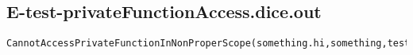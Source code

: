 \subsection{E-test-privateFunctionAccess.dice.out}
\begin{verbatim}
CannotAccessPrivateFunctionInNonProperScope(something.hi,something,test)

\end{verbatim}